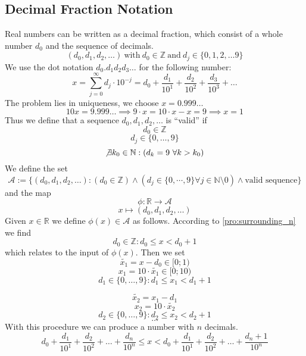 \documentclass[english,titlepage]{uzhpub}
\theoremstyle{definition}
\theoremstyle{plain}
\theoremstyle{remark}
\theoremstyle{example}
\begin{document}
   \subsection{Decimal Fraction Notation}
   Real numbers can be written as a decimal fraction, which consist of a whole number \(d_0\) and the sequence of decimals.
   \[(d_0, d_1, d_2,\ldots)~\text{with}~d_0 \in \mathbb{Z}~\text{and}~d_j \in \{0, 1, 2, \ldots 9\}\]
   We use the dot notation \(d_0.d_1d_2d_3\ldots\) for the following number:
   \[x = \sum_{j=0}^\infty d_j \cdot 10^{-j} = d_0 + \frac{d_1}{10^1} + \frac{d_2}{10^2} + \frac{d_3}{10^3}+\ldots\]
   The problem lies in uniqueness, we choose \(x = 0.999\ldots\)
   \[10x = 9.999\ldots \implies 9 \cdot x = 10 \cdot x - x = 9 \implies x = 1\]
   Thus we define that a sequence \(d_0, d_1, d_2,\ldots\) is ``valid'' if
   \[d_0 \in \mathbb{Z}\]
   \[d_j \in \{0, \ldots, 9\}\]
   \[\not\exists k_0 \in \mathbb{N}: (d_k = 9~\forall k > k_0)\]
   We define the set
   \[\mathcal{A} := \{(d_0, d_1, d_2,\ldots): (d_0 \in \mathbb{Z}) \land (d_j \in \{0, \cdots, 9\} \forall j \in \mathbb{N}\setminus 0) \land \text{valid sequence}\}\]
   and the map
   \[\phi: \mathbb{R} \to \mathcal{A}\]
   \[x \mapsto (d_0, d_1, d_2, \ldots)\]
   Given \(x \in \mathbb{R}\) we define \(\phi(x) \in \mathcal{A}\) as follows.
   According to \cref{pro:surrounding_n} we find
   \[d_0 \in \mathbb{Z}: d_0 \leq x < d_0 + 1\]
   which relates to the input of \(\phi(x)\).
   Then we set
   \[\widetilde{x_1} = x - d_0 \in [0;1)\]
   \[x_1 = 10 \cdot \widetilde{x_1} \in [0;10)\]
   \[d_1 \in \{0,\ldots,9\}: d_1 \leq x_1 < d_1 + 1\]

   \[\widetilde{x_2} = x_1 - d_1\]
   \[x_2 = 10 \cdot \widetilde{x_2}\]
   \[d_2 \in \{0,\ldots,9\}: d_2 \leq x_2 < d_2 + 1\]
   \[\ldots\]
   With this procedure we can produce a number with \(n\) decimals.
   \[d_0 + \frac{d_1}{10^1} + \frac{d_2}{10^2} + \ldots + \frac{d_n}{10^n} \leq x < d_0 + \frac{d_1}{10^1} + \frac{d_2}{10^2} + \ldots + \frac{d_n + 1}{10^n}\]
\end{document}

